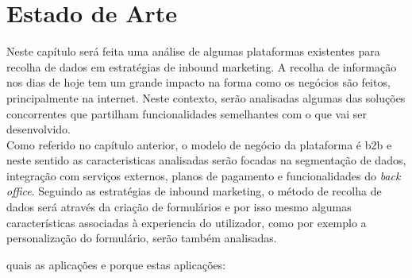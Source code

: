 \chapter{Estado de Arte}
\label{sec:estado-arte}

Neste capítulo será feita uma análise de algumas plataformas existentes para recolha de dados em estratégias de inbound marketing. A recolha de informação nos dias de hoje tem um grande impacto na forma como os negócios são feitos, principalmente na internet. Neste contexto, serão analisadas algumas das soluções concorrentes que partilham funcionalidades semelhantes com o que vai ser desenvolvido.\\
Como referido no capítulo anterior, o modelo de negócio da plataforma é \gls{b2b} e neste sentido as caracteristicas analisadas serão focadas na segmentação de dados, integração com serviços externos, planos de pagamento e funcionalidades do \textit{back office}.
Seguindo as estratégias de inbound marketing, o método de recolha de dados será através da criação de formulários e por isso mesmo algumas características associadas à experiencia do utilizador, como por exemplo a personalização do formulário, serão também analisadas.


quais as aplicações e porque estas aplicações:



\blankpage

\glsresetall



